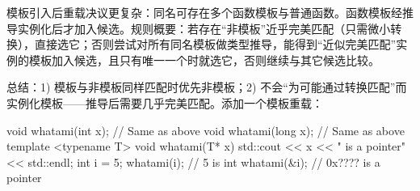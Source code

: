 模板引入后重载决议更复杂：同名可存在多个函数模板与普通函数。函数模板经推导实例化后才加入候选。规则概要：若存在“非模板”近乎完美匹配（只需微小转换），直接选它；否则尝试对所有同名模板做类型推导，能得到“近似完美匹配”实例的模板加入候选，且只有唯一一个时就选它，否则继续与其它候选比较。

总结：1) 模板与非模板同样匹配时优先非模板；2) 不会“为可能通过转换匹配”而实例化模板——推导后需要几乎完美匹配。添加一个模板重载：

\begin{code}
void whatami(int x); // Same as above
void whatami(long x); // Same as above
template <typename T> void whatami(T* x) {
  std::cout << x << " is a pointer" << std::endl;
}
int i = 5;
whatami(i);    // 5 is int
whatami(&i);    // 0x???? is a pointer
\end{code}

